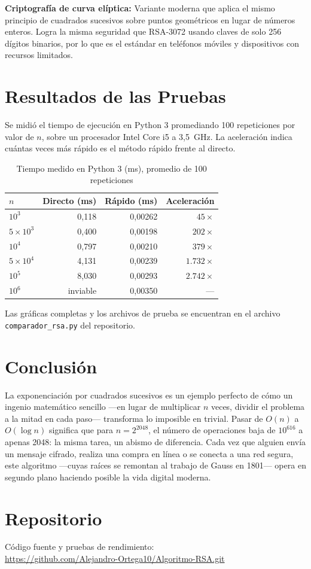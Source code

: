 \documentclass[twocolumn, 10pt]{article}
\begin{document}
\textbf{Criptografía de curva elíptica:} Variante moderna que aplica el
mismo principio de cuadrados sucesivos sobre puntos geométricos en lugar
de números enteros. Logra la misma seguridad que RSA-3072 usando claves
de solo 256 dígitos binarios, por lo que es el estándar en teléfonos
móviles y dispositivos con recursos limitados.

\section{Resultados de las Pruebas}

Se midió el tiempo de ejecución en Python 3 promediando 100 repeticiones
por valor de $n$, sobre un procesador Intel Core i5 a 3,5~GHz.
La aceleración indica cuántas veces más rápido es el
método rápido frente al directo.

\begin{table}[H]
\centering
\caption{Tiempo medido en Python 3 (ms), promedio de 100 repeticiones}
\small
\begin{tabular}{@{}lrrr@{}}
\toprule
$n$ & Directo (ms) & Rápido (ms) & Aceleración \\
\midrule
$10^3$             & 0,118  & 0,00262 & $45\times$ \\
$5\times10^3$      & 0,400  & 0,00198 & $202\times$ \\
$10^4$             & 0,797  & 0,00210 & $379\times$ \\
$5\times10^4$      & 4,131  & 0,00239 & $1.732\times$ \\
$10^5$             & 8,030  & 0,00293 & $2.742\times$ \\
$10^6$             & inviable & 0,00350 & --- \\
\bottomrule
\end{tabular}
\end{table}

\noindent Las gráficas completas y los archivos de prueba se encuentran
en el archivo \texttt{comparador\_rsa.py} del repositorio.

\section{Conclusión}

La exponenciación por cuadrados sucesivos es un ejemplo perfecto de cómo
un ingenio matemático sencillo ---en lugar de multiplicar $n$ veces,
dividir el problema a la mitad en cada paso--- transforma lo imposible en
trivial. Pasar de $O(n)$ a $O(\log n)$ significa que para $n = 2^{2048}$,
el número de operaciones baja de $10^{616}$ a apenas 2048: la misma tarea,
un abismo de diferencia. Cada vez que alguien envía un mensaje cifrado,
realiza una compra en línea o se conecta a una red segura, este algoritmo
---cuyas raíces se remontan al trabajo de Gauss en 1801--- opera en
segundo plano haciendo posible la vida digital moderna.

\section*{Repositorio}

\noindent
Código fuente y pruebas de rendimiento:\\
\url{https://github.com/Alejandro-Ortega10/Algoritmo-RSA.git}
\end{document}
